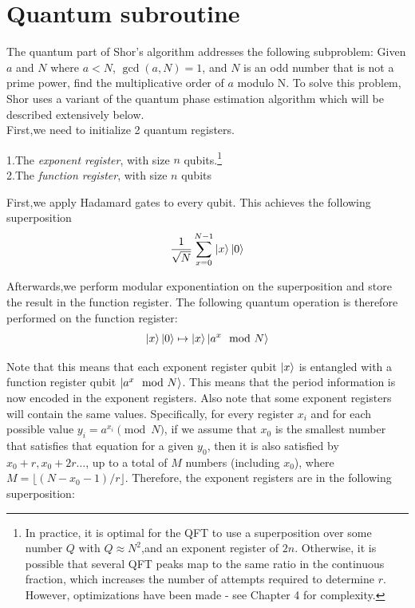 \chapter{Quantum subroutine}

The quantum part of Shor's algorithm addresses the following subproblem:
Given $a$ and $N$ where $a<N$, $\gcd(a,N) = 1$, and $N$ is an odd number that is not a prime power, find the multiplicative order of $a$ modulo N.
To solve this problem, Shor uses a variant of the quantum phase estimation algorithm which will be described extensively below.\\

First,we need to initialize 2 quantum registers.

1.The \emph{exponent register}, with size $n$ qubits.\footnote{In practice, it is optimal for the QFT to use a superposition over some number $Q$ with $Q\approx N^2$,and an exponent register of $2n$. Otherwise, it is possible that several QFT peaks map to the same ratio in the continuous fraction, which increases the number of attempts required to determine $r$. However, optimizations have been made - see Chapter 4 for complexity.}\\
2.The \emph{function register}, with size $n$ qubits

First,we apply Hadamard gates to every qubit. This achieves the following superposition
\begin{equation}
    \frac{1}{\sqrt{N}} \sum_{x=0}^{N-1} \ket{x} \ket{0}
\end{equation}

Afterwards,we perform modular exponentiation on the superposition and store the result in the function register. The following quantum operation is therefore performed on the function register:
\begin{equation}
    \ket{x} \ket{0} \mapsto \ket{x} \ket{a^x \mod N}
\end{equation}

 Note that this means that each exponent register qubit $\ket{x}$ is entangled with a function register qubit $\ket{a^x \mod N}$. This means that the period information is now encoded in the exponent registers. Also note that some exponent registers will contain the same values. Specifically, for every register $x_i$ and for each possible value $y_i = a^{x_i} \pmod N$, if we assume that $x_0$ is the smallest number that satisfies that equation for a given $y_0$, then it is also satisfied by $x_0 + r,x_0 + 2r\dots$, up to a total of $M$ numbers (including $x_0$), where $M = \lfloor(N-x_0-1)/r \rfloor$. Therefore, the exponent registers are in the following superposition:
 
